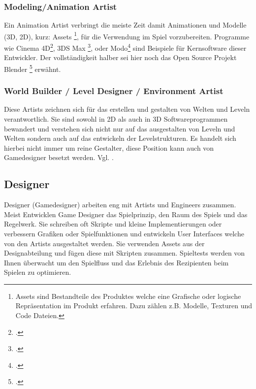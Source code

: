 \documentclass[pagesize, paper=a4, fontsize=12pt, titlepage=true, headings=small, headnosepline, abstractoff, liststotoc, nochapterprefix, plainheadsepline, twoside]{scrreprt}
\begin{document}
\subsubsection{Modeling/Animation Artist}
Ein Animation Artist verbringt die meiste Zeit damit Animationen und Modelle (3D, 2D), kurz: Assets \footnote{Assets sind Bestandteile des Produktes welche eine Grafische oder logische Repräsentation im Produkt erfahren. Dazu zählen z.B. Modelle, Texturen und Code Dateien.}, für die Verwendung im Spiel vorzubereiten. Programme wie Cinema 4D\footcite{MaxonC4d2014}, 3DS Max \footcite{AutodeskMax2014}, oder Modo\footcite{FoundryModo2014} sind Beispiele für Kernsoftware dieser Entwickler. Der vollständigkeit halber sei hier noch das Open Source Projekt Blender \footcite{Blender2015} erwähnt.

\subsubsection{World Builder / Level Designer / Environment Artist}
Diese Artists zeichnen sich für das erstellen und gestalten von Welten und Leveln verantwortlich. Sie sind sowohl in 2D als auch in 3D Softwareprogrammen bewandert und verstehen sich nicht nur auf das ausgestalten von Leveln und Welten sondern auch auf das entwickeln der Levelstrukturen. Es handelt sich hierbei nicht immer um reine Gestalter, diese Position kann auch von Gamedesigner besetzt werden. Vgl. \autocite[S. 24]{Chandler2006}.

\subsection{Designer}
Designer (Gamedesigner) arbeiten eng mit Artists und Engineers zusammen. Meist Entwicklen Game Designer das Spielprinzip, den Raum des Spiels und das Regelwerk. Sie schreiben oft Skripte und kleine Implementierungen oder verbessern Grafiken oder Spielfunktionen und entwickeln User Interfaces welche von den Artists ausgestaltet werden. Sie verwenden Assets aus der Designabteilung und fügen diese mit Skripten zusammen. Spieltests werden von Ihnen überwacht um den Spielfluss und das Erlebnis des Rezipienten beim Spielen zu optimieren.
\end{document}
